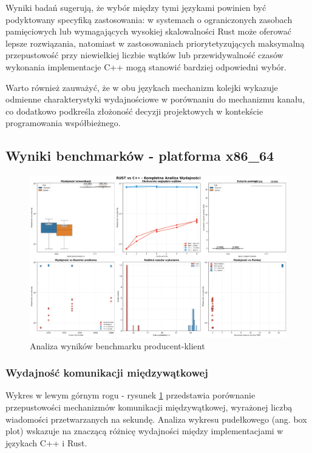 Wyniki badań sugerują, że wybór między tymi językami powinien być podyktowany specyfiką zastosowania: w systemach o ograniczonych zasobach pamięciowych lub wymagających wysokiej skalowalności Rust może oferować lepsze rozwiązania, natomiast w zastosowaniach priorytetyzujących maksymalną przepustowość przy niewielkiej liczbie wątków lub przewidywalność czasów wykonania implementacje C++ mogą stanowić bardziej odpowiedni wybór.

Warto również zauważyć, że w obu językach mechanizm kolejki wykazuje odmienne charakterystyki wydajnościowe w porównaniu do mechanizmu kanału, co dodatkowo podkreśla złożoność decyzji projektowych w kontekście programowania współbieżnego.
\subsection{Wyniki benchmarków - platforma x86\_64}
\begin{figure}[H]
    \centering
    \includegraphics[width=\textwidth]{analiza/images/conc/pc/x86/mega_overview_2x3.png}
    \caption{Analiza wyników benchmarku producent-klient}
    \label{analiza_benchmarku_producent_klient_x86_64}
\end{figure}

\subsubsection{Wydajność komunikacji międzywątkowej}
Wykres w lewym górnym rogu - rysunek \ref{analiza_benchmarku_producent_klient_x86_64} przedstawia porównanie przepustowości mechanizmów komunikacji międzywątkowej, wyrażonej liczbą wiadomości przetwarzanych na sekundę. Analiza wykresu pudełkowego (ang. box plot) wskazuje na znaczącą różnicę wydajności między implementacjami w językach C++ i Rust.

